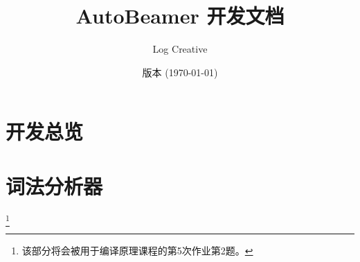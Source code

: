 \documentclass{ctexrep}
\begin{document}
    \title{\textsf{AutoBeamer} \textbf{开发文档}}
    \author{Log Creative}
    \date{版本  (\today)}
    \maketitle
    \tableofcontents

    \chapter{开发总览}

    

    \chapter{词法分析器}\footnote{该部分将会被用于编译原理课程的第5次作业第2题。}

    
\end{document}
